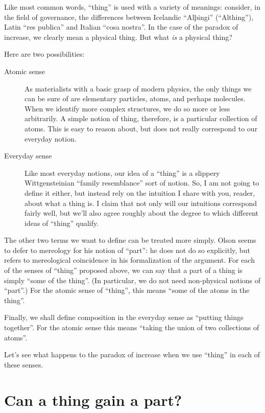 \documentclass[english,a5paper]{scrartcl}
\begin{document}
Like most common words, “thing” is used with a variety of meanings: consider, in the field of governance, the differences between Icelandic “Alþingi” (“Althing”), Latin “res publica” and Italian “cosa nostra”. In the case of the paradox of increase, we clearly mean a physical thing. But what \emph{is} a physical thing?

Here are two possibilities:

\begin{description}
\item[Atomic sense]As materialists with a basic grasp of modern physics, the only things we can be sure of are elementary particles, atoms, and perhaps molecules. When we identify more complex structures, we do so more or less arbitrarily. A simple notion of thing, therefore, is a particular collection of atoms. This is easy to reason about, but does not really correspond to our everyday notion.
\item[Everyday sense]Like most everyday notions, our idea of a “thing” is a slippery Wittgensteinian “family resemblance” sort of notion. So, I am not going to define it either, but instead rely on the intuition I share with you, reader, about what a thing is. I claim that not only will our intuitions correspond fairly well, but we’ll also agree roughly about the degree to which different ideas of “thing” qualify.
\end{description}

The other two terms we want to define can be treated more simply. Olson seems to defer to mereology for his notion of “part”: he does not do so explicitly, but refers to mereological coincidence in his formalization of the argument. For each of the senses of “thing” proposed above, we can say that a part of a thing is simply “some of the thing”. (In particular, we do not need non-physical notions of “part”.) For the atomic sense of “thing”, this means “some of the atoms in the thing”.

Finally, we shall define composition in the everyday sense as “putting things together”. For the atomic sense this means “taking the union of two collections of atoms”.

Let’s see what happens to the paradox of increase when we use “thing” in each of these senses.

\section{Can a thing gain a part?}
\end{document}
